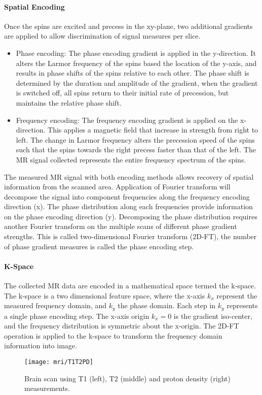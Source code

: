 \paragraph{Spatial Encoding}
Once the spins are excited and precess in the xy-plane, two additional gradients are applied to allow discrimination of signal measures per slice. 

\begin{itemize}
\item Phase encoding: The phase encoding gradient is applied in the y-direction. It alters the Larmor frequency of the spins based the location of the y-axis, and results in phase shifts of the spins relative to each other. The phase shift is determined by the duration and amplitude of the gradient, when the gradient is switched off, all spins return to their initial rate of precession, but maintains the relative phase shift. 
\item Frequency encoding: The frequency encoding gradient is applied on the x-direction. This applies a magnetic field that increase in strength from right to left. The change in Larmor frequency alters the precession speed of the spins such that the spins towards the right precess faster than that of the left. The MR signal collected represents the entire frequency spectrum of the spins. 
\end{itemize}

The measured MR signal with both encoding methods allows recovery of spatial information from the scanned area. Application of Fourier transform will decompose the signal into component frequencies along the frequency encoding direction (x). The phase distribution along each frequencies provide information on the phase encoding direction (y). Decomposing the phase distribution requires another Fourier transform on the multiple scans of different phase gradient strengths. This is called two-dimensional Fourier transform (2D-FT), the number of phase gradient measures is called the phase encoding step. 

\paragraph{K-Space}

The collected MR data are encoded in a mathematical space termed the k-space. The k-space is a two dimensional feature space, where the x-axis $k_x$ represent the measured frequency domain, and $k_y$ the phase domain. Each step in $k_y$ represents a single phase encoding step. The x-axis origin $k_x=0$ is the gradient iso-center, and the frequency distribution is symmetric about the x-origin. The 2D-FT operation is applied to the k-space to transform the frequency domain information into image. 

\begin{figure}[htb]
\begin{center}
\texttt{[image: mri/T1T2PD]}
\caption{Brain scan using T1 (left), T2 (middle) and proton density (right) measurements.}
\label{fig:T1T2PD}
\end{center}

\end{figure}
